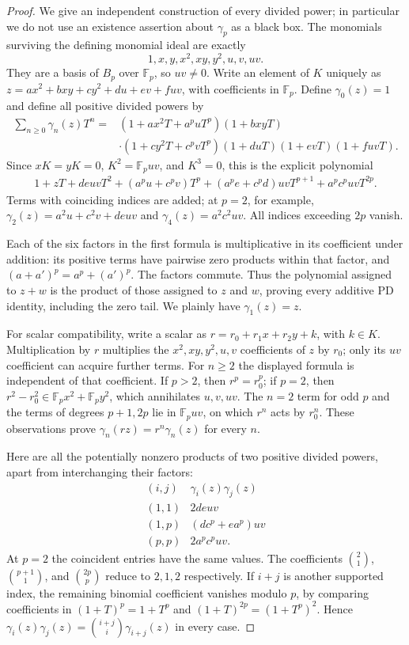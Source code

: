 \begin{proof}
We give an independent construction of every divided power; in particular
we do not use an existence assertion about $\gamma_p$ as a black box.
The monomials surviving the defining monomial ideal are exactly
\[
 1,x,y,x^2,xy,y^2,u,v,uv.
\]
They are a basis of $B_p$ over $\mathbb F_p$, so $uv\ne0$.
Write an element of $K$ uniquely as
$z=ax^2+bxy+cy^2+du+ev+fuv$, with coefficients in $\mathbb F_p$.
Define $\gamma_0(z)=1$ and define all positive divided powers by
\begin{align*}
 \sum_{n\geq0}\gamma_n(z)T^n={}&
 (1+ax^2T+a^puT^p)(1+bxyT)\\
 &\cdot(1+cy^2T+c^pvT^p)(1+duT)(1+evT)(1+fuvT).
\end{align*}
Since $xK=yK=0$, $K^2=\mathbb F_puv$, and $K^3=0$, this is the
explicit polynomial
\begin{align*}
 1+zT+deuvT^2+(a^pu+c^pv)T^p
 +(a^pe+c^pd)uvT^{p+1}+a^pc^puvT^{2p}.
\end{align*}
Terms with coinciding indices are added; at $p=2$, for example,
$\gamma_2(z)=a^2u+c^2v+deuv$ and $\gamma_4(z)=a^2c^2uv$.
All indices exceeding $2p$ vanish.

Each of the six factors in the first formula is multiplicative in its
coefficient under addition: its positive terms have pairwise zero
products within that factor, and $(a+a')^p=a^p+(a')^p$.
The factors commute. Thus the polynomial assigned to $z+w$ is the
product of those assigned to $z$ and $w$, proving every additive
PD identity, including the zero tail. We plainly have $\gamma_1(z)=z$.

For scalar compatibility, write a scalar as
$r=r_0+r_1x+r_2y+k$, with $k\in K$. Multiplication by $r$ multiplies
the $x^2,xy,y^2,u,v$ coefficients of $z$ by $r_0$; only its $uv$
coefficient can acquire further terms. For $n\geq2$ the displayed
formula is independent of that coefficient. If $p>2$, then
$r^p=r_0^p$; if $p=2$, then
$r^2-r_0^2\in\mathbb F_px^2+\mathbb F_py^2$, which annihilates
$u,v,uv$. The $n=2$ term for odd $p$ and the terms of degrees
$p+1,2p$ lie in $\mathbb F_puv$, on which $r^n$ acts by $r_0^n$.
These observations prove $\gamma_n(rz)=r^n\gamma_n(z)$ for every $n$.

Here are all the potentially nonzero products of two positive divided
powers, apart from interchanging their factors:
\[
 \begin{array}{c|c}
 (i,j)&\gamma_i(z)\gamma_j(z)\\\hline
 (1,1)&2deuv\\
 (1,p)&(dc^p+ea^p)uv\\
 (p,p)&2a^pc^puv.
 \end{array}
\]
At $p=2$ the coincident entries have the same values. The coefficients
$\binom{2}{1}$, $\binom{p+1}{1}$, and $\binom{2p}{p}$ reduce to
$2,1,2$ respectively. If $i+j$ is another supported index, the
remaining binomial coefficient vanishes modulo $p$, by comparing
coefficients in $(1+T)^p=1+T^p$ and
$(1+T)^{2p}=(1+T^p)^2$. Hence
$\gamma_i(z)\gamma_j(z)=\binom{i+j}{i}\gamma_{i+j}(z)$ in every case.


\end{proof}
